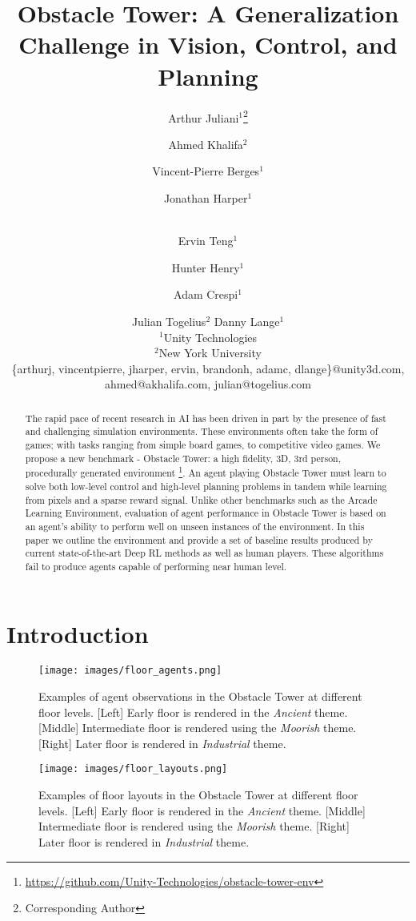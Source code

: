 \documentclass{article}
\title{Obstacle Tower: A Generalization Challenge in Vision, Control, and Planning}
\author{
Arthur Juliani$^1$\footnote{Corresponding Author}\and
Ahmed Khalifa$^2$\and
Vincent-Pierre Berges$^1$\and
Jonathan Harper$^1$\and\\
Ervin Teng$^1$\and
Hunter Henry$^1$\and
Adam Crespi$^1$\and
Julian Togelius$^2$\And
Danny Lange$^1$\\
\affiliations
$^1$Unity Technologies\\
$^2$New York University\\
\emails
\{arthurj, vincentpierre, jharper, ervin, brandonh, adamc, dlange\}@unity3d.com,
\\
ahmed@akhalifa.com, 
julian@togelius.com
}
\begin{document}
\maketitle

\begin{abstract}
The rapid pace of recent research in AI has been driven in part by the presence of fast and challenging simulation environments. These environments often take the form of games; with tasks ranging from simple board games, to competitive video games. We propose a new benchmark - Obstacle Tower: a high fidelity, 3D, 3rd person, procedurally generated environment \footnote{\url{https://github.com/Unity-Technologies/obstacle-tower-env}}. An agent playing Obstacle Tower must learn to solve both low-level control and high-level planning problems in tandem while learning from pixels and a sparse reward signal. Unlike other benchmarks such as the Arcade Learning Environment, evaluation of agent performance in Obstacle Tower is based on an agent's ability to perform well on unseen instances of the environment. In this paper we outline the environment and provide a set of baseline results produced by current state-of-the-art Deep RL methods as well as human players. These algorithms fail to produce agents capable of performing near human level.
\end{abstract}
\section{Introduction}


\begin{figure*}[!t]
    \centering
    \texttt{[image: images/floor\_agents.png]}
    \caption{Examples of agent observations in the Obstacle Tower at different floor levels. [Left] Early floor is rendered in the \emph{Ancient} theme. [Middle] Intermediate floor is rendered using the \emph{Moorish} theme. [Right] Later floor is rendered in \emph{Industrial} theme.}
    \label{fig:visualExampleAgent}
\end{figure*}

\begin{figure*}[!t]
    \centering
    \texttt{[image: images/floor\_layouts.png]}
    \caption{Examples of floor layouts in the Obstacle Tower at different floor levels. [Left] Early floor is rendered in the \emph{Ancient} theme. [Middle] Intermediate floor is rendered using the \emph{Moorish} theme. [Right] Later floor is rendered in \emph{Industrial} theme.}
    \label{fig:visualExampleFloors}
\end{figure*}
\end{document}
